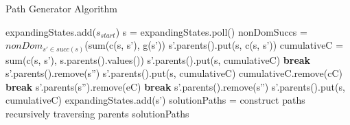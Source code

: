 \documentclass[10pt, a4paper, conference, compsocconf]{IEEEtran}
\begin{document}
\begin{algorithm}
	\caption{Path Generator Algorithm}
	\label{algPathGen}
    \begin{algorithmic}[1]
			\State expandingStates.add($s_{start}$)
    				\State s = expandingStates.poll()
				\State nonDomSuccs = $nonDom_{s' \in succ(s)}$(sum(c(s, s'), g(s'))
    						\State s'.parents().put(s, c(s, s'))
    					\Else
    						\State cumulativeC = sum(c(s, s'), s.parents().values())
    							\State s'.parents().put(s, cumulativeC)
    						\Else
									\State \textbf{break}
									\State s'.parents().remove(s'')
									\State s'.parents().put(s, cumulativeC)
								\Else
												\State cumulativeC.remove(cC) 
												\State \textbf{break}
												\State s'.parents(s'').remove(eC) 
												\State \textbf{break}
											\EndIf
										\EndFor
											\State s'.parents().remove(s'')
										\EndIf
									\EndFor
											\State s'.parents().put(s, cumulativeC)
									\EndIf
								\EndIf
							\EndFor    						
    						\EndIf
    					\EndIf
    						\State expandingStates.add(s')
    					\EndIf
    				\EndFor
    			\EndWhile
    			\State solutionPaths = construct paths recursively traversing parents
    			\State \Return solutionPaths
    		\EndFunction
	\end{algorithmic}
\end{algorithm}
\end{document}
